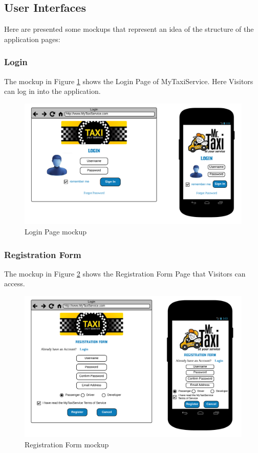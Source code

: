 \subsection{User Interfaces}
Here are presented some mockups that represent an idea of the structure of the application pages:

\subsubsection{Login}
The mockup in Figure \ref{fig:login} shows the Login Page of MyTaxiService. Here Visitors can log in into the application.

\begin{figure}[htbp]
\centering
\includegraphics[width=\textwidth]{cpt/img/Login}
\caption{Login Page mockup}
\label{fig:login}
\end{figure}
\clearpage

\subsubsection{Registration Form}
The mockup in Figure \ref{fig:regform} shows the Registration Form Page that Visitors can access.

\begin{figure}[htbp]
\centering
\includegraphics[width=\textwidth]{cpt/img/RegForm}
\caption{Registration Form mockup}
\label{fig:regform}
\end{figure}
\clearpage

